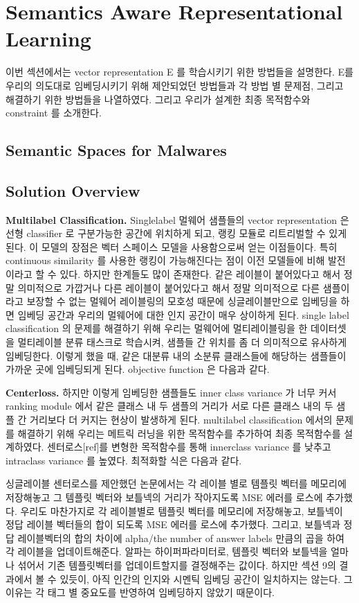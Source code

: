 \section{Semantics Aware Representational Learning}
이번 섹션에서는 vector representation E 를 학습시키기 위한 방법들을 설명한다. E를 우리의 의도대로 임베딩시키기 위해 제안되었던 방법들과 각 방법 별 문제점, 그리고 해결하기 위한 방법들을 나열하였다. 그리고 우리가 설계한 최종 목적함수와 constraint 를 소개한다. 

\subsection{Semantic Spaces for Malwares}


\subsection{Solution Overview}
\textbf{Multilabel Classification. }
 Singlelabel 멀웨어 샘플들의 vector representation 은 선형 classifier 로 구분가능한 공간에 위치하게 되고, 랭킹 모듈로 리트리벌할 수 있게 된다. 이 모델의 장점은 벡터 스페이스 모델을 사용함으로써 얻는 이점들이다. 특히 continuous similarity 를 사용한 랭킹이 가능해진다는 점이 이전 모델들에 비해 발전이라고 할 수 있다. 하지만 한계들도 많이 존재한다. 같은 레이블이 붙어있다고 해서 정말 의미적으로 가깝거나 다른 레이블이 붙어있다고 해서 정말 의미적으로 다른 샘플이라고 보장할 수 없는 멀웨어 레이블링의 모호성 때문에 싱글레이블만으로 임베딩을 하면 임베딩 공간과 우리의 멀웨어에 대한 인지 공간이 매우 상이하게 된다.  
single label classification 의 문제를 해결하기 위해 우리는 멀웨어에 멀티레이블링을 한 데이터셋을 멀티레이블 분류 태스크로 학습시켜, 샘플들 간 위치를 좀 더 의미적으로 유사하게 임베딩한다. 이렇게 했을 때, 같은 대분류 내의 소분류 클래스들에 해당하는 샘플들이 가까운 곳에 임베딩되게 된다. objective function 은 다음과 같다. 

\textbf{Centerloss. }
하지만 이렇게 임베딩한 샘플들도 inner class variance 가 너무 커서 ranking module 에서 같은 클래스 내 두 샘플의 거리가 서로 다른 클래스 내의 두 샘플 간 거리보다 더 커지는 현상이 발생하게 된다. multilabel classification 에서의 문제를 해결하기 위해 우리는 메트릭 러닝을 위한 목적함수를 추가하여 최종 목적함수를 설계하였다. 센터로스[ref]를 변형한 목적함수를 통해 innerclass variance 를 낮추고 intraclass variance 를 높였다. 최적화할 식은 다음과 같다. 

싱글레이블 센터로스를 제안했던 논문에서는 각 레이블 별로 템플릿 벡터를 메모리에 저장해놓고 그 템플릿 벡터와 보틀넥의 거리가 작아지도록 MSE 에러를 로스에 추가했다. 우리도 마찬가지로 각 레이블별로 템플릿 벡터를 메모리에 저장해놓고, 보틀넥이 정답 레이블 벡터들의 합이 되도록 MSE 에러를 로스에 추가했다. 그리고, 보틀넥과 정답 레이블벡터의 합의 차이에 alpha/the number of answer labels 만큼의 곱을 하여 각 레이블을 업데이트해준다. 알파는 하이퍼파라미터로, 템플릿 벡터와 보틀넥을 얼마나 섞어서 기존 템플릿벡터를 업데이트할지를 결정해주는 값이다. 하지만 섹션 9의 결과에서 볼 수 있듯이, 아직 인간의 인지와 시멘틱 임베딩 공간이 일치하지는 않는다. 그 이유는 각 태그 별 중요도를 반영하여 임베딩하지 않았기 때문이다. 

